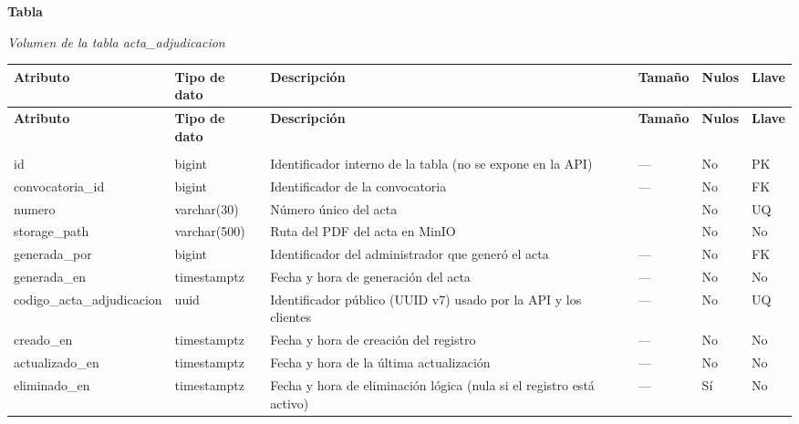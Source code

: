 \label{tab:volumen_acta_adjudicacion}
\noindent\textbf{Tabla~\thetable}\par\nopagebreak
\noindent\textit{Volumen de la tabla acta\_\allowbreak{}adjudicacion}\par\nopagebreak
\begingroup\small\linespread{1}\selectfont\setlength{\tabcolsep}{4pt}
\begin{longtable}{>{\raggedright\arraybackslash}p{3.4cm} >{\raggedright\arraybackslash}p{2.5cm} >{\raggedright\arraybackslash}p{4.8cm} >{\centering\arraybackslash}p{1.6cm}>{\centering\arraybackslash}p{1.1cm} >{\centering\arraybackslash}p{1.3cm}}
\toprule
\textbf{Atributo} & \textbf{Tipo de dato} & \textbf{Descripción} & \textbf{Tamaño} & \textbf{Nulos} & \textbf{Llave} \\
\midrule
\endfirsthead
\toprule
\textbf{Atributo} & \textbf{Tipo de dato} & \textbf{Descripción} & \textbf{Tamaño} & \textbf{Nulos} & \textbf{Llave} \\
\midrule
\endhead
\endfoot
\bottomrule
\multicolumn{6}{l}{\textit{Nota.} Elaboración propia.} \\
\endlastfoot
id & bigint & Identificador interno de la tabla (no se expone en la API) & — & No & PK \\
convocatoria\_\allowbreak{}id & bigint & Identificador de la convocatoria & — & No & FK \\
numero & varchar(30) & Número único del acta & 30 & No & UQ \\
storage\_\allowbreak{}path & varchar(500) & Ruta del PDF del acta en MinIO & 500 & No & No \\
generada\_\allowbreak{}por & bigint & Identificador del administrador que generó el acta & — & No & FK \\
generada\_\allowbreak{}en & timestamptz & Fecha y hora de generación del acta & — & No & No \\
codigo\_\allowbreak{}acta\_\allowbreak{}adjudicacion & uuid & Identificador público (UUID v7) usado por la API y los clientes & — & No & UQ \\
creado\_\allowbreak{}en & timestamptz & Fecha y hora de creación del registro & — & No & No \\
actualizado\_\allowbreak{}en & timestamptz & Fecha y hora de la última actualización & — & No & No \\
eliminado\_\allowbreak{}en & timestamptz & Fecha y hora de eliminación lógica (nula si el registro está activo) & — & Sí & No \\
\end{longtable}
\endgroup
\addtocounter{table}{-1}


